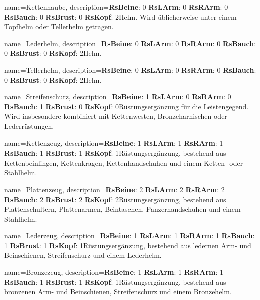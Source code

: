 {
    name={Kettenhaube},
    description={\textbf{RsBeine}: 0 \textbf{RsLArm}: 0 \textbf{RsRArm}: 0 \textbf{RsBauch}: 0 \textbf{RsBrust}: 0 \textbf{RsKopf}: 2\newline Helm. Wird üblicherweise unter einem Topfhelm oder Tellerhelm getragen.}
}


{
    name={Lederhelm},
    description={\textbf{RsBeine}: 0 \textbf{RsLArm}: 0 \textbf{RsRArm}: 0 \textbf{RsBauch}: 0 \textbf{RsBrust}: 0 \textbf{RsKopf}: 2\newline Helm.}
}


{
    name={Tellerhelm},
    description={\textbf{RsBeine}: 0 \textbf{RsLArm}: 0 \textbf{RsRArm}: 0 \textbf{RsBauch}: 0 \textbf{RsBrust}: 0 \textbf{RsKopf}: 2\newline Helm.}
}


{
    name={Streifenschurz},
    description={\textbf{RsBeine}: 1 \textbf{RsLArm}: 0 \textbf{RsRArm}: 0 \textbf{RsBauch}: 1 \textbf{RsBrust}: 0 \textbf{RsKopf}: 0\newline Rüstungsergänzung für die Leistengegend. Wird insbesondere kombiniert mit Kettenwesten, Bronzeharnischen oder Lederrüstungen.}
}


{
    name={Kettenzeug},
    description={\textbf{RsBeine}: 1 \textbf{RsLArm}: 1 \textbf{RsRArm}: 1 \textbf{RsBauch}: 1 \textbf{RsBrust}: 1 \textbf{RsKopf}: 1\newline Rüstungsergänzung, bestehend aus Kettenbeinlingen, Kettenkragen, Kettenhandschuhen und einem Ketten- oder Stahlhelm.}
}


{
    name={Plattenzeug},
    description={\textbf{RsBeine}: 2 \textbf{RsLArm}: 2 \textbf{RsRArm}: 2 \textbf{RsBauch}: 2 \textbf{RsBrust}: 2 \textbf{RsKopf}: 2\newline Rüstungsergänzung, bestehend aus Plattenschultern, Plattenarmen, Beintaschen, Panzerhandschuhen und einem Stahlhelm.}
}


{
    name={Lederzeug},
    description={\textbf{RsBeine}: 1 \textbf{RsLArm}: 1 \textbf{RsRArm}: 1 \textbf{RsBauch}: 1 \textbf{RsBrust}: 1 \textbf{RsKopf}: 1\newline Rüstungsergänzung, bestehend aus ledernen Arm- und Beinschienen, Streifenschurz und einem Lederhelm.}
}


{
    name={Bronzezeug},
    description={\textbf{RsBeine}: 1 \textbf{RsLArm}: 1 \textbf{RsRArm}: 1 \textbf{RsBauch}: 1 \textbf{RsBrust}: 1 \textbf{RsKopf}: 1\newline Rüstungsergänzung, bestehend aus bronzenen Arm- und Beinschienen, Streifenschurz und einem Bronzehelm.}
}


